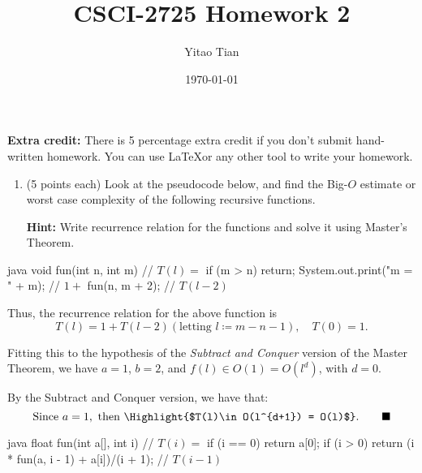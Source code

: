\documentclass[12pt, a4paper]{article}
\title{CSCI-2725 Homework 2}
\author{Yitao Tian}
\date{\today}
\newcommand{\QED}{\tag*{$\blacksquare$}}
\begin{document}
\maketitle

\textbf{Extra credit:} There is 5 percentage extra credit if you don't submit hand-written homework.
You can use \LaTeX or any other tool to write your homework.

\begin{enumerate}
  \item (5 points each) Look at the pseudocode below,
  and find the Big-$O$ estimate or worst case complexity of the following recursive functions.

  \textbf{Hint:} Write recurrence relation for the functions and solve it using Master's Theorem.
\end{enumerate}

\begin{MintedUnbreakableCodeBlock}{java}
      void fun(int n, int m) {        // $T(l)=$
        if (m > n) return;
        System.out.print("m = " + m); // $1+$
        fun(n, m + 2);                // $T(l-2)$
      }
\end{MintedUnbreakableCodeBlock}

Thus, the recurrence relation for the above function is
\begin{equation*}
  T(l) = 1 + T(l-2) (\textrm{letting } l \coloneqq m-n-1), \quad T(0) = 1.
\end{equation*}

Fitting this to the hypothesis of the \textit{Subtract and Conquer} version of the Master Theorem,
we have $a=1$, $b=2$, and $f(l)\in O(1)=O(l^d)$, with $d=0$.

By the Subtract and Conquer version, we have that:
\begin{equation*}
  \textrm{Since } a = 1, \textrm{ then } \Highlight{$T(l)\in O(l^{d+1}) = O(l)$}. \QED
\end{equation*}



\newpage



\begin{MintedUnbreakableCodeBlock}{java}
      float fun(int a[], int i) {                    // $T(i)=$
        if (i == 0) {
          return a[0];
        }
        if (i > 0) {
          return (i * fun(a, i - 1) + a[i])/(i + 1); // $T(i-1)$
        }
      }
\end{MintedUnbreakableCodeBlock}
\end{document}
